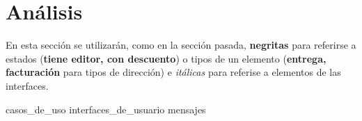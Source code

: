 %
%

\section{Análisis}

En esta sección se utilizarán, como en la sección pasada, \textbf{negritas}
para referirse a estados (\textbf{tiene editor, con descuento}) o tipos de un
elemento (\textbf{entrega, facturación} para tipos de dirección) e
\textit{itálicas} para referise a elementos de las interfaces.

{casos_de_uso}
{interfaces_de_usuario}
{mensajes}

